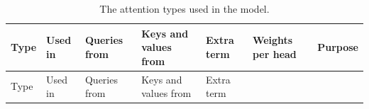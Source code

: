 \begin{longtable}[]{@{}
  >{\raggedright\arraybackslash}p{}
  >{\raggedright\arraybackslash}p{}
  >{\raggedright\arraybackslash}p{}
  >{\raggedright\arraybackslash}p{}
  >{\raggedright\arraybackslash}p{}
  >{\raggedright\arraybackslash}p{}
  >{\raggedright\arraybackslash}p{}@{}}
\caption{The attention types used in the model.}\tabularnewline
\toprule\noalign{}
\begin{minipage}[b]{\linewidth}\raggedright
Type
\end{minipage} & \begin{minipage}[b]{\linewidth}\raggedright
Used in
\end{minipage} & \begin{minipage}[b]{\linewidth}\raggedright
Queries from
\end{minipage} & \begin{minipage}[b]{\linewidth}\raggedright
Keys and values from
\end{minipage} & \begin{minipage}[b]{\linewidth}\raggedright
Extra term
\end{minipage} & \begin{minipage}[b]{\linewidth}\raggedright
Weights per head
\end{minipage} & \begin{minipage}[b]{\linewidth}\raggedright
Purpose
\end{minipage} \\
\midrule\noalign{}
\endfirsthead
\toprule\noalign{}
\begin{minipage}[b]{\linewidth}\raggedright
Type
\end{minipage} & \begin{minipage}[b]{\linewidth}\raggedright
Used in
\end{minipage} & \begin{minipage}[b]{\linewidth}\raggedright
Queries from
\end{minipage} & \begin{minipage}[b]{\linewidth}\raggedright
Keys and values from
\end{minipage} & \begin{minipage}[b]{\linewidth}\raggedright
Extra term
\end{minipage} & \begin{minipage}[b]{\linewidth}\raggedright

\end{minipage}
\end{longtable}
